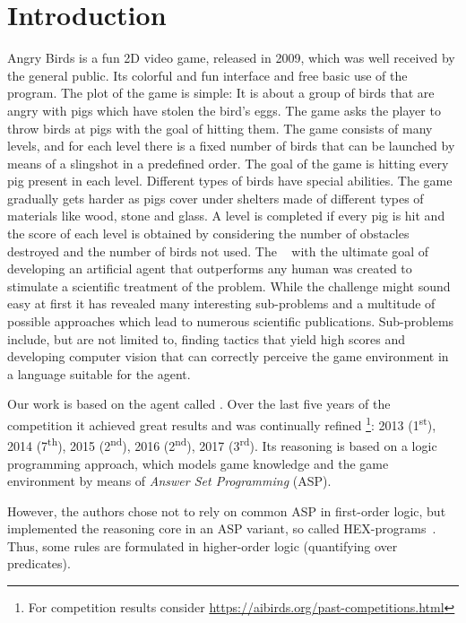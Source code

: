 \section{Introduction}
\label{sec:intro}

Angry Birds is a fun 2D video game, released in 2009, which was well received by the general public. Its colorful and fun interface and free basic use of
the program. The plot of the game is simple: It is about a group of birds that are angry with pigs which have stolen the bird's eggs. The game asks the player to throw birds at pigs with the goal of hitting them. The game consists of many levels, and for each level there is a fixed number of birds that can be launched by means of a slingshot in a predefined order. The goal of the game is hitting every pig present in each level. Different types of birds have special abilities. The game gradually gets harder as pigs cover under shelters made of different types of materials like wood, stone and glass. A level is completed if every pig is hit and the score of each level is obtained by considering the number of obstacles destroyed and the number of birds not used.
The \abc~\cite{angryAI} with the ultimate goal of developing an artificial agent that outperforms any human was created to stimulate a scientific treatment of the problem. While the challenge might sound easy at first it has revealed many interesting sub-problems and a multitude of possible approaches which lead to numerous scientific publications.
Sub-problems include, but are not limited to, finding tactics that yield high scores and developing computer vision that can correctly perceive the game environment in a language suitable for the agent.

Our work is based on the agent called \ah \cite{angryhex}. Over the last five years of the competition it achieved great results and was continually refined \footnote{For competition results consider \url{https://aibirds.org/past-competitions.html}}: 2013 (1\textsuperscript{st}), 2014 (7\textsuperscript{th}), 2015 (2\textsuperscript{nd}), 2016 (2\textsuperscript{nd}), 2017 (3\textsuperscript{rd}). Its reasoning is based on a logic programming approach, which models game knowledge and the game environment by means of \emph{Answer Set Programming} (ASP).

However, the authors chose not to rely on common ASP in first-order logic, but implemented the reasoning core in an ASP variant, so called HEX-programs~\cite{hex}. Thus, some rules are formulated in higher-order logic (quantifying over predicates).

